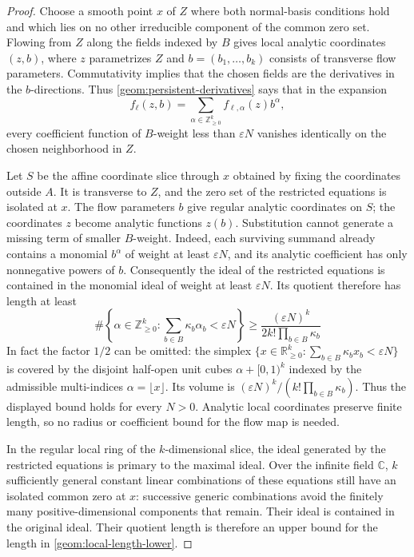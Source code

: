 \documentclass[11pt]{article}
\newcommand{\CC}{\mathbb C}
\newcommand{\RR}{\mathbb R}
\newcommand{\NN}{\mathbb Z_{\ge0}}
\theoremstyle{definition}
\theoremstyle{remark}
\numberwithin{equation}{section}
\begin{document}
\begin{proof}
Choose a smooth point $x$ of $Z$ where both normal-basis conditions hold and
which lies on no other irreducible component of the common zero set. Flowing
from $Z$ along the fields indexed by $B$ gives local analytic coordinates
$(z,b)$, where $z$ parametrizes $Z$ and $b=(b_1,\ldots,b_k)$ consists of
transverse flow parameters. Commutativity implies that the chosen fields
are the derivatives in the $b$-directions. Thus
\eqref{geom:persistent-derivatives} says that in the expansion
\[
 f_\ell(z,b)=\sum_{\alpha\in\NN^k} f_{\ell,\alpha}(z)b^\alpha,
\]
every coefficient function of $B$-weight less than $\varepsilon N$ vanishes
identically on the chosen neighborhood in $Z$.

Let $S$ be the affine coordinate slice through $x$ obtained by fixing the
coordinates outside $A$. It is transverse to $Z$, and the zero set of the
restricted equations is isolated at $x$. The flow parameters $b$ give
regular analytic coordinates on $S$; the coordinates $z$ become analytic
functions $z(b)$. Substitution cannot generate a missing term of smaller
$B$-weight. Indeed, each surviving summand already contains a monomial
$b^\alpha$ of weight at least $\varepsilon N$, and its analytic coefficient
has only nonnegative powers of $b$. Consequently the ideal of the
restricted equations is contained in the monomial ideal of weight at least
$\varepsilon N$. Its quotient therefore has length at least
\begin{equation}
\label{geom:local-length-lower}
 \#\left\{\alpha\in\NN^k:
       \sum_{b\in B}\kappa_b\alpha_b<\varepsilon N\right\}
 \ge \frac{(\varepsilon N)^k}{2k!\prod_{b\in B}\kappa_b}
\end{equation}
In fact the factor $1/2$ can be omitted: the simplex
$\{x\in\RR_{\ge0}^k:\sum_{b\in B}\kappa_bx_b<\varepsilon N\}$
is covered by the disjoint half-open unit cubes $\alpha+[0,1)^k$
indexed by the admissible multi-indices $\alpha=\lfloor x\rfloor$. Its volume is
$(\varepsilon N)^k/(k!\prod_{b\in B}\kappa_b)$. Thus the displayed
bound holds for every $N>0$. Analytic local coordinates preserve finite
length, so no radius or coefficient bound for the flow map is needed.

In the regular local ring of the $k$-dimensional slice, the ideal generated
by the restricted equations is primary to the maximal ideal. Over the
infinite field $\CC$, $k$ sufficiently general constant linear
combinations of these equations still have an isolated common zero at
$x$: successive generic combinations avoid the finitely many
positive-dimensional components that remain. Their ideal is contained
in the original ideal. Their quotient length is therefore an upper bound
for the length in \eqref{geom:local-length-lower}.


\end{proof}
\end{document}
